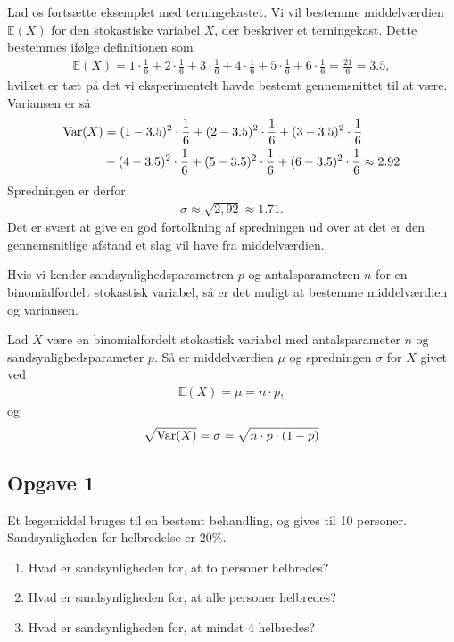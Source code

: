 \begin{exa}
Lad os fortsætte eksemplet med terningekastet. Vi vil bestemme middelværdien $\mathbb{E}(X)$ for den stokastiske variabel $X$, der beskriver et terningekast. Dette bestemmes ifølge definitionen som
\begin{align*}
\mathbb{E}(X) = 1\cdot \frac{1}{6} + 2\cdot \frac{1}{6}+3\cdot \frac{1}{6}+4\cdot \frac{1}{6}+5\cdot \frac{1}{6}+6\cdot \frac{1}{6} = \frac{21}{6} = 3.5,
\end{align*}
hvilket er tæt på det vi eksperimentelt havde bestemt gennemsnittet til at være. 
Variansen er så
\begin{align*}
\textnormal{Var}(X) &= (1-3.5)^2 \cdot \frac{1}{6} + (2-3.5)^2 \cdot \frac{1}{6} + (3-3.5)^2 \cdot \frac{1}{6}\\
 &+ (4-3.5)^2 \cdot \frac{1}{6} + (5-3.5)^2 \cdot \frac{1}{6} +(6-3.5)^2 \cdot \frac{1}{6} \approx 2.92
\end{align*}
Spredningen er derfor 
\begin{align*}
\sigma \approx \sqrt{2,92} \approx 1.71.
\end{align*}
Det er svært at give en god fortolkning af spredningen ud over at det er den gennemsnitlige afstand et slag vil have fra middelværdien. 
\end{exa}

Hvis vi kender sandsynlighedsparametren $p$ og antalsparametren $n$ for en binomialfordelt stokastisk variabel, så er det muligt at bestemme middelværdien og variansen.
\begin{setn}
Lad $X$ være en binomialfordelt stokastisk variabel med antalsparameter $n$ og sandsynlighedsparameter $p$. Så er middelværdien $\mu$ og spredningen $\sigma$ for $X$ givet ved
\begin{align*}
\mathbb{E}(X) = \mu = n\cdot p,
\end{align*} 
og 
\[
\sqrt{\textnormal{Var}(X)} = \sigma = \sqrt{n\cdot p\cdot (1-p)}
\]
\end{setn}



\subsection*{Opgave 1}
Et lægemiddel bruges til en bestemt behandling, og gives til 10 personer. Sandsynligheden for helbredelse er 20$\%$. 
\begin{enumerate}[label=\roman*)]
	\item Hvad er sandsynligheden for, at to personer helbredes?
	\item Hvad er sandsynligheden for, at alle personer helbredes?
	\item Hvad er sandsynligheden for, at mindst 4 helbredes? 
\end{enumerate}

